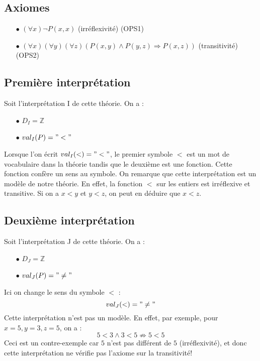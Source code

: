 \subsection*{Axiomes}
\begin{itemize}
\item[$\bullet$] $ (\forall x) \neg P(x,x) $  (irréflexivité) (OPS1)
\item[$\bullet$] $ (\forall x) (\forall y) (\forall z) (P(x,y) \wedge P(y,z) \Rightarrow P(x,z))$ (transitivité) (OPS2)
\end{itemize}
\subsection*{Première interprétation}
Soit l'interprétation I de cette théorie. On a :
\begin{itemize}
\item[$\bullet$] $D_I = \mathbb{Z} $
\item[$\bullet$] $val_I (P) = "<"$
\end{itemize}
Lorsque l'on écrit $val_I(<) = "<"$, le premier symbole $<$ est un mot de vocabulaire dans la théorie tandis que le deuxième est une fonction. Cette fonction confère un sens au symbole. 
On remarque que cette interprétation est un modèle de notre théorie. En effet, la fonction $<$ sur les entiers est irréflexive et transitive. Si on a $x < y$ et $y <z$, on peut en déduire que $x<z$.
\subsection*{Deuxième interprétation}
Soit l'interprétation J de cette théorie. On a : 
\begin{itemize}
\item[$\bullet$] $D_J = \mathbb{Z} $
\item[$\bullet$] $val_J (P) = "\ne"$
\end{itemize}
Ici on change le sens du symbole $<$ :
$$val_J(<) = "\ne"$$
Cette interprétation n'est pas un modèle. En effet, par exemple, pour $x=5, y=3, z=5$, on a :
$$5<3 \wedge 3<5 \nRightarrow 5<5$$
Ceci est un contre-exemple car $5$ n'est pas différent de $5$ (irréflexivité), et donc cette interprétation ne vérifie pas l'axiome sur la transitivité!

